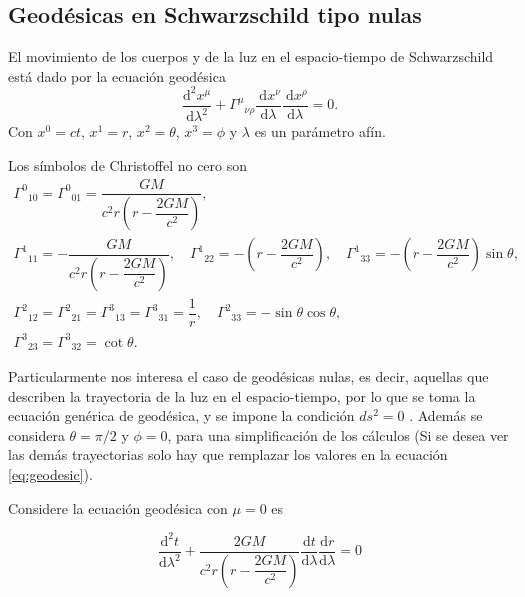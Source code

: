 \subsection{Geodésicas en Schwarzschild tipo  nulas}

\noindent El movimiento de los cuerpos y de la luz en el espacio-tiempo de Schwarzschild está dado por la ecuación geodésica
\begin{equation}
    \frac{\mathrm{d}^2 x^\mu}{\mathrm{d} \lambda^2}+\Gamma^\mu{ }_{\nu \rho} \frac{\mathrm{~d} x^\nu}{\mathrm{d} \lambda} \frac{\mathrm{~d} x^\rho}{\mathrm{d} \lambda}=0.
    \label{eq:geodesic}
\end{equation}
Con $x^0 = ct$, $x^1 = r$, $x^2 = \theta$, $x^3 = \phi$ y $\lambda$ es un parámetro afín.

Los símbolos de Christoffel no cero son
\begin{equation}
    \begin{array}{l}
        \Gamma^0{ }_{10}=\Gamma^0{ }_{01}=\dfrac{G M}{c^2 r\left(r - \dfrac{2 G M}{c^2}\right)},                                                                                                                       \\
        \Gamma^1{ }_{11}=-\dfrac{G M}{c^2 r\left(r - \dfrac{2 G M}{c^2}\right)}, \quad \Gamma^1{ }_{22}=-\left(r - \dfrac{2 G M}{c^2}\right), \quad \Gamma^1{ }_{33}=-\left(r - \dfrac{2 G M}{c^2}\right) \sin \theta, \\
        \Gamma^2{ }_{12}=\Gamma^2{ }_{21}=\Gamma^3{ }_{13}=\Gamma^3{ }_{31}=\dfrac{1}{r}, \quad \Gamma^2{ }_{33}=-\sin \theta \cos \theta,                                                                             \\
        \Gamma^3{ }_{23}=\Gamma^3{ }_{32}=\cot \theta.
    \end{array}
\end{equation}

Particularmente nos interesa el caso de geodésicas nulas, es decir, aquellas que describen la trayectoria de la luz en el espacio-tiempo, por lo que se toma la ecuación genérica de geodésica, y se impone la condición $ds^2 = 0$  . Además se considera $\theta=\pi/2$ y $\phi=0$, para una simplificación de los cálculos  (Si se desea ver las demás trayectorias solo hay que remplazar los valores en la ecuación \ref{eq:geodesic}).

Considere  la ecuación geodésica con $\mu=0$ es

\begin{equation}
    \frac{\mathrm{d}^2 t}{\mathrm{d} \lambda^2}+\dfrac{2 G M}{c^2 r\left(r - \dfrac{2 G M}{c^2}\right)} \frac{\mathrm{d} t}{\mathrm{d} \lambda} \frac{\mathrm{d} r}{\mathrm{d} \lambda}=0
\end{equation}

